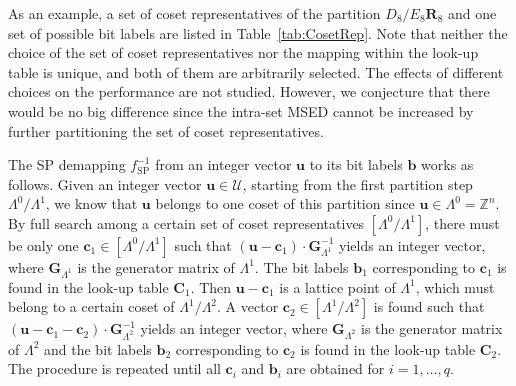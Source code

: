 \documentclass[journal]{IEEEtran}
\newcommand{\Z}{\mathbb{Z}}
\newcommand{\U}{\mathcal{U}}
\newcommand{\bb}{\boldsymbol{b}}
\newcommand{\bc}{\boldsymbol{c}}
\newcommand{\bu}{\boldsymbol{u}}
\newcommand{\bC}{\boldsymbol{C}}
\newcommand{\bG}{\boldsymbol{G}}
\newcommand{\bR}{\boldsymbol{R}}
\begin{document}
As an example, a set of coset representatives of the partition $D_8/E_8\bR_8$ and one set of possible bit labels are listed in Table~\ref{tab:CosetRep}. Note that neither the choice of the set of coset representatives nor the mapping within the look-up table is unique, and both of them are arbitrarily selected. The effects of different choices on the performance are not studied. However, we conjecture that there would be no big difference since the intra-set MSED cannot be increased by further partitioning the set of coset representatives.

The SP demapping $f^{-1}_{\text{SP}}$ from an integer vector $\bu$ to its bit labels $\bb$ works as follows. Given an integer vector $\bu \in \U$, starting from the first partition step $\Lambda^0/\Lambda^1$, we know that $\bu$ belongs to one coset of this partition since $\bu\in \Lambda^0=\Z^n$. By full search among a certain set of coset representatives $[\Lambda^0/\Lambda^1]$,  there must be only one $\bc_1\in[\Lambda^0/\Lambda^1]$ such that $(\bu-\bc_1)\cdot\bG_{\Lambda^1}^{-1}$ yields an integer vector, where $\bG_{\Lambda^1}$ is the generator matrix of $\Lambda^1$. The bit labels $\bb_1$ corresponding to $\bc_1$ is found in the look-up table $\bC_1$. Then $\bu-\bc_1$ is a lattice point of $\Lambda^1$, which must belong to a certain coset of $\Lambda^1/\Lambda^2$. A vector $\bc_2\in[\Lambda^1/\Lambda^2]$ is found such that $(\bu-\bc_1-\bc_2)\cdot \bG_{\Lambda^{2}}^{-1}$ yields an integer vector, where $\bG_{\Lambda^{2}}$ is the generator matrix of $\Lambda^2$ and the bit labels $\bb_2$ corresponding to $\bc_2$ is found in the look-up table $\bC_2$. The procedure is repeated until all $\bc_i$ and $\bb_i$ are obtained for $i=1,\ldots,q$. 
\end{document}
